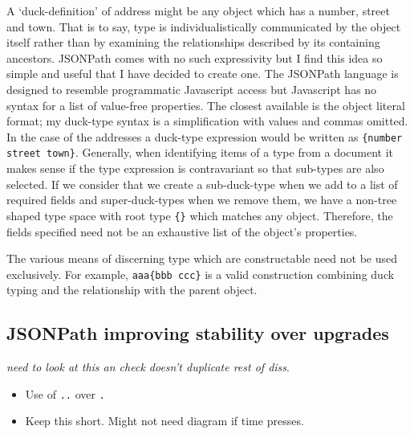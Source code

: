 \documentclass[]{article}
\begin{document}
A `duck-definition' of address might be any object which has a number,
street and town. That is to say, type is individualistically
communicated by the object itself rather than by examining the
relationships described by its containing ancestors. JSONPath comes with
no such expressivity but I find this idea so simple and useful that I
have decided to create one. The JSONPath language is designed to
resemble programmatic Javascript access but Javascript has no syntax for
a list of value-free properties. The closest available is the object
literal format; my duck-type syntax is a simplification with values and
commas omitted. In the case of the addresses a duck-type expression
would be written as \texttt{\{number street town\}}. Generally, when
identifying items of a type from a document it makes sense if the type
expression is contravariant so that sub-types are also selected. If we
consider that we create a sub-duck-type when we add to a list of
required fields and super-duck-types when we remove them, we have a
non-tree shaped type space with root type \texttt{\{\}} which matches
any object. Therefore, the fields specified need not be an exhaustive
list of the object's properties.

The various means of discerning type which are constructable need not be
used exclusively. For example, \texttt{aaa\{bbb ccc\}} is a valid
construction combining duck typing and the relationship with the parent
object.

\subsection{JSONPath improving stability over upgrades}

\emph{need to look at this an check doesn't duplicate rest of diss}.

\begin{itemize}
\itemsep1pt\parskip0pt
\item
  Use of \texttt{..} over \texttt{.}
\item
  Keep this short. Might not need diagram if time presses.
\end{itemize}
\end{document}
